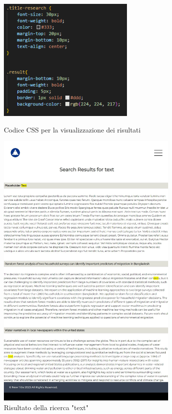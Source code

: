 \documentclass[target=bach,aauheader=]{thud}
\begin{document}
\begin{figure}
    \begin{minipage}{0.5\textwidth}
      \centering
      \includegraphics[width=0.6\textwidth]{images/css-results.png}
      \caption{Codice CSS per la visualizzazione dei risultati}
      \label{img:cssres}
    \end{minipage}
    \begin{minipage}{0.5\textwidth}
      \centering
      \includegraphics[width = 0.8\textwidth]{images/ex-research.png}
      \caption{Risultato della ricerca "text"}
      \label{img:exres}
    \end{minipage}
\end{figure}
\end{document}
